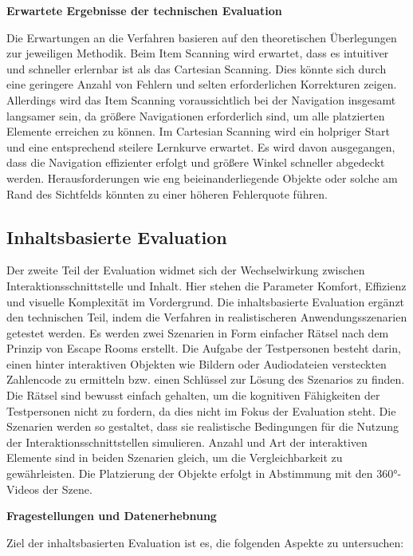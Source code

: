 \textbf{Erwartete Ergebnisse der technischen Evaluation}

Die Erwartungen an die Verfahren basieren auf den theoretischen Überlegungen zur jeweiligen Methodik. Beim Item Scanning wird erwartet, dass es intuitiver und schneller erlernbar ist als das Cartesian Scanning. Dies könnte sich durch eine geringere Anzahl von Fehlern und selten erforderlichen Korrekturen zeigen. Allerdings wird das Item Scanning voraussichtlich bei der Navigation insgesamt langsamer sein, da größere Navigationen erforderlich sind, um alle platzierten Elemente erreichen zu können. Im Cartesian Scanning wird ein holpriger Start und eine entsprechend steilere Lernkurve erwartet. Es wird davon ausgegangen, dass die Navigation effizienter erfolgt und größere Winkel schneller abgedeckt werden. Herausforderungen wie eng beieinanderliegende Objekte oder solche am Rand des Sichtfelds könnten zu einer höheren Fehlerquote führen.

\subsection{Inhaltsbasierte Evaluation}

Der zweite Teil der Evaluation widmet sich der Wechselwirkung zwischen Interaktionsschnittstelle und Inhalt. Hier stehen die Parameter Komfort, Effizienz und visuelle Komplexität im Vordergrund. Die inhaltsbasierte Evaluation ergänzt den technischen Teil, indem die Verfahren in realistischeren Anwendungsszenarien getestet werden.
Es werden zwei Szenarien in Form einfacher Rätsel nach dem Prinzip von Escape Rooms erstellt. Die Aufgabe der Testpersonen besteht darin, einen hinter interaktiven Objekten wie Bildern oder Audiodateien versteckten Zahlencode zu ermitteln bzw. einen Schlüssel zur Lösung des Szenarios zu finden. Die Rätsel sind bewusst einfach gehalten, um die kognitiven Fähigkeiten der Testpersonen nicht zu fordern, da dies nicht im Fokus der Evaluation steht. Die Szenarien werden so gestaltet, dass sie realistische Bedingungen für die Nutzung der Interaktionsschnittstellen simulieren. Anzahl und Art der interaktiven Elemente sind in beiden Szenarien gleich, um die Vergleichbarkeit zu gewährleisten. Die Platzierung der Objekte erfolgt in Abstimmung mit den 360°-Videos der Szene. 

\textbf{Fragestellungen und Datenerhebnung}

Ziel der inhaltsbasierten Evaluation ist es, die folgenden Aspekte zu untersuchen:

